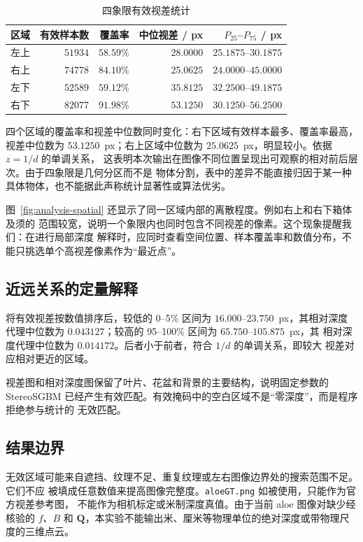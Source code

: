 \begin{table}[H]
  \centering
  \small
  \caption{四象限有效视差统计}
  \label{tab:quadrant-statistics}
  \begin{tabular}{lrrrr}
    \toprule
    区域 & 有效样本数 & 覆盖率 & 中位视差 / px & $P_{25}$--$P_{75}$ / px \\
    \midrule
    左上 & $51934$ & $58.59\%$ & $28.0000$ & $25.1875$--$30.1875$ \\
    右上 & $74778$ & $84.10\%$ & $25.0625$ & $24.0000$--$45.0000$ \\
    左下 & $52589$ & $59.12\%$ & $35.8125$ & $32.2500$--$49.1875$ \\
    右下 & $82077$ & $91.98\%$ & $53.1250$ & $30.1250$--$56.2500$ \\
    \bottomrule
  \end{tabular}
\end{table}

四个区域的覆盖率和视差中位数同时变化：右下区域有效样本最多、覆盖率最高，视差中位数为
$53.1250$~px；右上区域中位数为 $25.0625$~px，明显较小。依据 $z=1/d$ 的单调关系，
这表明本次输出在图像不同位置呈现出可观察的相对前后层次。由于四象限是几何分区而不是
物体分割，表中的差异不能直接归因于某一种具体物体，也不能据此声称统计显著性或算法优劣。

图~\ref{fig:analysis-spatial} 还显示了同一区域内部的离散程度。例如右上和右下箱体及须的
范围较宽，说明一个象限内也同时包含不同视差的像素。这个现象提醒我们：在进行局部深度
解释时，应同时查看空间位置、样本覆盖率和数值分布，不能只挑选单个高视差像素作为“最近点”。

\subsection{近远关系的定量解释}

将有效视差按数值排序后，较低的 0--5\% 区间为 $16.000$--$23.750$~px，其相对深度
代理中位数为 $0.043127$；较高的 95--100\% 区间为 $65.750$--$105.875$~px，其
相对深度代理中位数为 $0.014172$。后者小于前者，符合 $1/d$ 的单调关系，即较大
视差对应相对更近的区域。

视差图和相对深度图保留了叶片、花盆和背景的主要结构，说明固定参数的 StereoSGBM
已经产生有效匹配。有效掩码中的空白区域不是“零深度”，而是程序拒绝参与统计的
无效匹配。

\subsection{结果边界}

无效区域可能来自遮挡、纹理不足、重复纹理或左右图像边界处的搜索范围不足。它们不应
被填成任意数值来提高图像完整度。\texttt{aloeGT.png} 如被使用，只能作为官方视差参考图，
不能作为相机标定或米制深度真值。由于当前 aloe 图像对缺少经核验的 $f$、$B$ 和
$\mathbf{Q}$，本实验不能输出米、厘米等物理单位的绝对深度或带物理尺度的三维点云。
